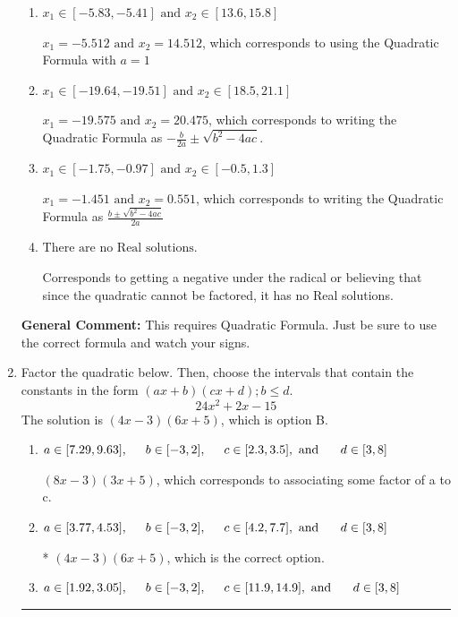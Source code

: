 \documentclass{extbook}[14pt]
\newcommand{\litem}[1]{\item #1

\rule{\textwidth}{0.4pt}}
\begin{document}
\begin{enumerate}
{\begin{enumerate}[label=\Alph*.]
* $x_1 = -0.551 \text{ and } x_2 = 1.451$, which is the correct option.
\item \( x_1 \in [-5.83, -5.41] \text{ and } x_2 \in [13.6, 15.8] \)

 $x_1 = -5.512 \text{ and } x_2 = 14.512$, which corresponds to using the Quadratic Formula with $a=1$
\item \( x_1 \in [-19.64, -19.51] \text{ and } x_2 \in [18.5, 21.1] \)

 $x_1 = -19.575 \text{ and } x_2 = 20.475$, which corresponds to writing the Quadratic Formula as $-\frac{b}{2a} \pm \sqrt{b^2 - 4ac}$.
\item \( x_1 \in [-1.75, -0.97] \text{ and } x_2 \in [-0.5, 1.3] \)

 $x_1 = -1.451 \text{ and } x_2 = 0.551$, which corresponds to writing the Quadratic Formula as $\frac{b \pm \sqrt{b^2 - 4ac}}{2a}$
\item \( \text{There are no Real solutions.} \)

Corresponds to getting a negative under the radical or believing that since the quadratic cannot be factored, it has no Real solutions.
\end{enumerate}

\textbf{General Comment:} This requires Quadratic Formula. Just be sure to use the correct formula and watch your signs.
}
\litem{
Factor the quadratic below. Then, choose the intervals that contain the constants in the form $(ax+b)(cx+d); b \leq d.$
\[ 24x^{2} +2 x -15 \]The solution is \( (4x -3)(6x + 5) \), which is option B.\begin{enumerate}[label=\Alph*.]
\item \( a \in [7.29, 9.63], \hspace*{5mm} b \in [-3, 2], \hspace*{5mm} c \in [2.3, 3.5], \text{ and } \hspace*{5mm} d \in [3, 8] \)

 $(8x -3)(3x + 5)$, which corresponds to associating some factor of a to c.
\item \( a \in [3.77, 4.53], \hspace*{5mm} b \in [-3, 2], \hspace*{5mm} c \in [4.2, 7.7], \text{ and } \hspace*{5mm} d \in [3, 8] \)

* $(4x -3)(6x + 5)$, which is the correct option.
\item \( a \in [1.92, 3.05], \hspace*{5mm} b \in [-3, 2], \hspace*{5mm} c \in [11.9, 14.9], \text{ and } \hspace*{5mm} d \in [3, 8] \)


\end{enumerate}}
\end{enumerate}
\end{document}
